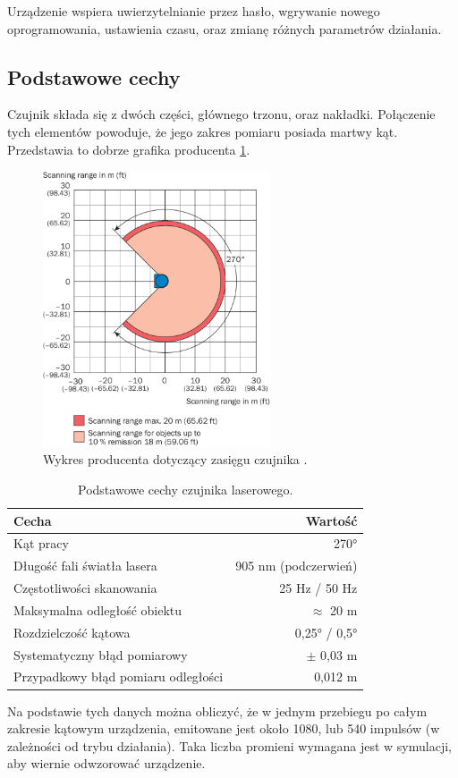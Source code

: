 		Urządzenie wspiera uwierzytelnianie przez hasło, wgrywanie nowego oprogramowania,
		ustawienia czasu, oraz zmianę różnych parametrów działania.

	\subsection{Podstawowe cechy}
		Czujnik składa się z dwóch części, głównego trzonu, oraz nakładki.
		Połączenie tych elementów powoduje, że jego zakres pomiaru posiada martwy kąt.
		Przedstawia to dobrze grafika producenta \ref{fig:lidar}.
		\begin{figure}[h]
		\centering
		\includegraphics[width=0.6\textwidth]{graphics/sick.png}
		\caption{Wykres producenta dotyczący zasięgu czujnika \cite{sick_website}.}
		\label{fig:lidar}
		\end{figure} 
		
		\begin{table}
		\centering
		\begin{tabular}{l r}
		Cecha & Wartość \\
		\hline
		Kąt pracy & \ang{270} \\
		Długość fali światła lasera & 905 \si{\nano\metre} (podczerwień) \\
		Częstotliwości skanowania & 25 \si{\hertz} / 50 \si{\hertz} \\
		Maksymalna odległość obiektu & $\approx$ 20 \si{\metre} \\
		Rozdzielczość kątowa & 0,25° / 0,5° \\
		Systematyczny błąd pomiarowy & $\pm$ 0,03 \si{\metre} \\
		Przypadkowy błąd pomiaru odległości & 0,012 \si{\metre} \\
		\end{tabular}
		\caption{Podstawowe cechy czujnika laserowego.}
		\label{tab:lidar}
		\end{table}
		Na podstawie tych danych można obliczyć, że w jednym przebiegu po całym zakresie kątowym urządzenia, 
		emitowane jest około 1080, lub 540 impulsów (w zależności od trybu działania).
		Taka liczba promieni wymagana jest w symulacji, aby wiernie odwzorować urządzenie.

